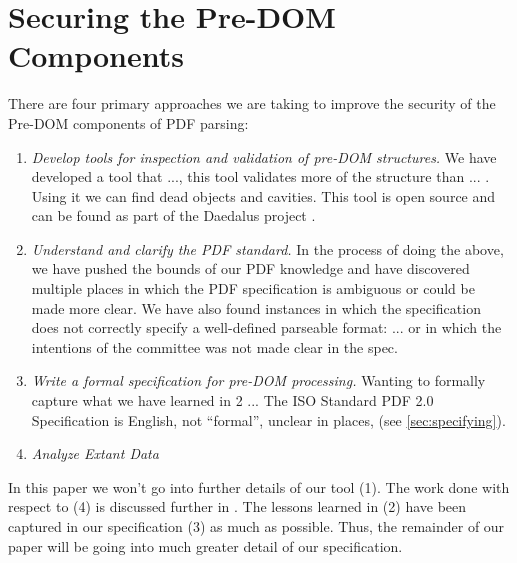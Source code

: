 \section{Securing the Pre-DOM Components }
\label{sec:securing}

There are four primary approaches we are taking to improve the security of the
Pre-DOM components of PDF parsing:
\begin{enumerate}
\item
  \emph{Develop tools for inspection and validation of pre-DOM structures.}
  We have developed a tool that ..., this tool validates more of the structure
  than ... .  Using it we can find dead objects and cavities.
  This tool is open source and can be found as part of the Daedalus
  project \cite{daedalus-url}.
 
\item
  \emph{Understand and clarify the PDF standard.}
  In the process of doing the above, we have pushed the bounds
  of our PDF knowledge and have discovered multiple places in which
  the PDF specification is ambiguous or could be made more clear.
  We have also found instances in which the specification
  does not correctly specify a well-defined parseable format:
  ... or in which the intentions of the committee was not made clear in
  the spec.
  
\item
  \emph{Write a formal specification for pre-DOM processing.}
  Wanting to formally capture what we have learned in 2 ...
  The ISO Standard PDF 2.0 Specification \cite{isotc171sc2wg8ISO32000220202020}
  is English, not ``formal'',
  unclear in places, 
  (see \cref{sec:specifying}).
  
\item
  \emph{Analyze Extant Data}
  
\end{enumerate}

In this paper we won't go into further details of our tool (1).
The work done with respect to (4) is discussed further
in \cite{icarus1,icarus2}.
The lessons learned in (2)
have been captured in our specification (3) as much as possible.
Thus, the remainder of our paper will be going into much greater detail of
our specification.
